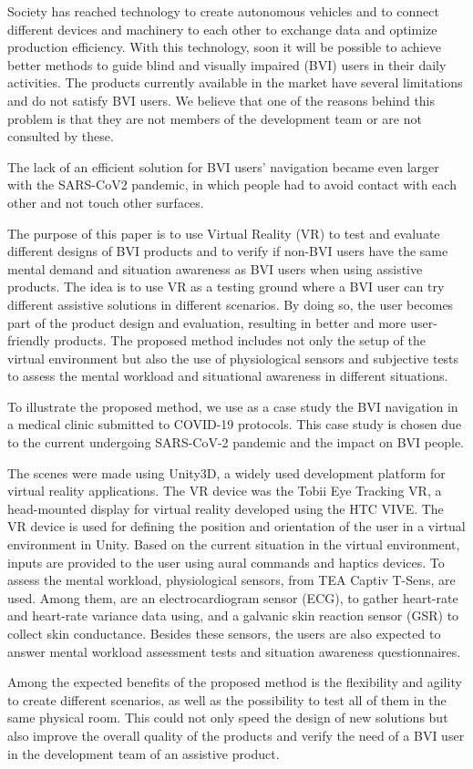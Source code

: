 
Society has reached technology to create autonomous vehicles and to connect different devices and machinery to each other to exchange data and optimize production efficiency.  With this technology, soon it will be possible to achieve better methods to guide blind and visually impaired (BVI) users in their daily activities. The products currently available in the market have several limitations and do not satisfy BVI users. We believe that one of the reasons behind this problem is that they are not members of the development team or are not consulted by these. 

The lack of an efficient solution for BVI users' navigation became even larger with the SARS-CoV2 pandemic, in which people had to avoid contact with each other and not touch other surfaces.

The purpose of this paper is to use Virtual Reality (VR) to test and evaluate different designs of BVI products and to verify if non-BVI users have the same mental demand and situation awareness as BVI users when using assistive products. The idea is to use VR as a testing ground where a BVI user can try different assistive solutions in different scenarios. By doing so, the user becomes part of the product design and evaluation, resulting in better and more user-friendly products. The proposed method includes not only the setup of the virtual environment but also the use of physiological sensors and subjective tests to assess the mental workload and situational awareness in different situations.

To illustrate the proposed method, we use as a case study the BVI navigation in a medical clinic submitted to COVID-19 protocols. This case study is chosen due to the current undergoing SARS-CoV-2 pandemic and the impact on BVI people.

The scenes were made using Unity3D, a widely used development platform for virtual reality applications. The VR device was the Tobii Eye Tracking VR, a head-mounted display for virtual reality developed using the HTC VIVE. The VR device is used for defining the position and orientation of the user in a virtual environment in Unity. Based on the current situation in the virtual environment, inputs are provided to the user using aural commands and haptics devices. To assess the mental workload, physiological sensors, from TEA Captiv T-Sens, are used. Among them, are an electrocardiogram sensor (ECG), to gather heart-rate and heart-rate variance data using, and a galvanic skin reaction sensor (GSR) to collect skin conductance. Besides these sensors, the users are also expected to answer mental workload assessment tests and situation awareness questionnaires.

Among the expected benefits of the proposed method is the flexibility and agility to create different scenarios, as well as the possibility to test all of them in the same physical room. This could not only speed the design of new solutions but also improve the overall quality of the products and verify the need of a BVI user in the development team of an assistive product.